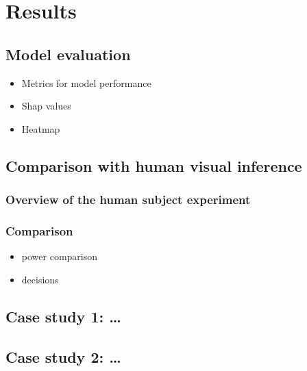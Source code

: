 \documentclass[]{interact}
\theoremstyle{plain}%
\theoremstyle{definition}
\theoremstyle{remark}
\providecommand{\tightlist}{%
  \setlength{\itemsep}{0pt}\setlength{\parskip}{0pt}}
\def\tightlist{}
\begin{document}
\hypertarget{results}{%
\section{Results}\label{results}}

\hypertarget{model-evaluation}{%
\subsection{Model evaluation}\label{model-evaluation}}

\begin{itemize}
\tightlist
\item
  Metrics for model performance
\item
  Shap values
\item
  Heatmap
\end{itemize}

\hypertarget{comparison-with-human-visual-inference}{%
\subsection{Comparison with human visual
inference}\label{comparison-with-human-visual-inference}}

\hypertarget{overview-of-the-human-subject-experiment}{%
\subsubsection{Overview of the human subject
experiment}\label{overview-of-the-human-subject-experiment}}

\hypertarget{comparison}{%
\subsubsection{Comparison}\label{comparison}}

\begin{itemize}
\tightlist
\item
  power comparison
\item
  decisions
\end{itemize}

\hypertarget{case-study-1}{%
\subsection{Case study 1: \ldots{}}\label{case-study-1}}

\hypertarget{case-study-2}{%
\subsection{Case study 2: \ldots{}}\label{case-study-2}}
\end{document}
